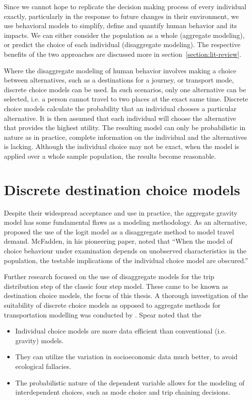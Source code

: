 Since we cannot hope to replicate the decision making process of every individual exactly, particularly in the response to future changes in their environment,  we use behavioral models to simplify, define and quantify human behavior and its impacts. We can either consider the population as a whole (aggregate modeling), or predict the choice of each individual (disaggregate modeling). The respective benefits of the two approaches are discussed more in section~\ref{section:lit-review}.

Where the disaggregate modeling of human behavior involves making a choice between alternatives, such as a destinations for a journey, or transport mode, discrete choice models can be used. In such scenarios, only one alternative can be selected, i.e. a person cannot travel to two places at the exact same time. Discrete choice models calculate the probability that an individual chooses a particular alternative. It is then assumed that each individual will choose the alternative that provides the highest utility. The resulting model can only be probabilistic in nature as in practice, complete information on the individual and the alternatives is lacking. Although the individual choice may not be exact, when the model is applied  over a whole sample population, the results become reasonable.  


\section{Discrete destination choice models}
Despite their widespread acceptance and use in practice, the aggregate gravity model has some fundamental flaws as a modeling methodology. As an alternative, \textcite{McFadden73, Akiva74} proposed the use of the logit model as a disaggregate method to model travel demand. McFadden, in his pioneering paper, noted that \enquote{When the model of choice behaviour under examination depends on unobserved characteristics in the population, the testable implications of the individual choice model are obscured.}\parencite{McFadden73}

Further research focused on the use of disaggregate models for the trip distribution step of the classic four step model. These came to be known as destination choice models, the focus of this thesis. A thorough investigation of the suitability of discrete choice models as opposed to aggregate methods for transportation modelling was conducted by \textcite{Spear77}. Spear noted that the 
\begin{itemize}
\item Individual choice models are more data efficient than conventional (i.e. gravity) models.
\item They can utilize the variation in socioeconomic data much better, to avoid ecological fallacies.
\item The probabilistic nature of the dependent variable allows for the modeling of interdependent choices, such as mode choice and trip chaining decisions. 
\end{itemize}
	

